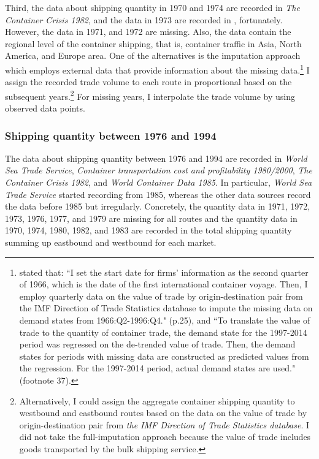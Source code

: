 Third, the data about shipping quantity in 1970 and 1974 are recorded in \textit{The Container Crisis 1982}, and the data in 1973 are recorded in , fortunately. However, the data in 1971, and 1972 are missing. Also, the data contain the regional level of the container shipping, that is, container traffic in Asia, North America, and Europe area. One of the alternatives is the imputation approach which employs external data that provide information about the missing data.\footnote{\cite{jeon2017learning} stated that: ``I set the start date for firms’ information as the second quarter of 1966, which is the date of the first international container voyage. Then, I employ quarterly data on the value of trade by origin-destination pair from the IMF Direction of Trade Statistics database to impute the missing data on demand states from 1966:Q2-1996:Q4." (p.25), and ``To translate the value of trade to the quantity of container trade, the demand state for the 1997-2014 period was regressed on the de-trended value of trade. Then, the demand states for periods with missing data are constructed as predicted values from the regression. For the 1997-2014 period, actual demand states are used." (footnote 37).} I assign the recorded trade volume to each route in proportional based on the subsequent years.\footnote{Alternatively, I could assign the aggregate container shipping quantity to westbound and eastbound routes based on the data on the value of trade by origin-destination pair from \textit{the IMF Direction of Trade Statistics database}. I did not take the full-imputation approach because the value of trade includes goods transported by the bulk shipping service.} For missing years, I interpolate the trade volume by using observed data points.



\subsubsection{Shipping quantity between 1976 and 1994}

The data about shipping quantity between 1976 and 1994 are recorded in \textit{World Sea Trade Service}, \textit{Container transportation cost and profitability 1980/2000}, \textit{The Container Crisis 1982}, and \textit{World Container Data 1985}. In particular, \textit{World Sea Trade Service} started recording from 1985, whereas the other data sources record the data before 1985 but irregularly. Concretely, the quantity data in 1971, 1972, 1973, 1976, 1977, and 1979 are missing for all routes and the quantity data in 1970, 1974, 1980, 1982, and 1983 are recorded in the total shipping quantity summing up eastbound and westbound for each market.




